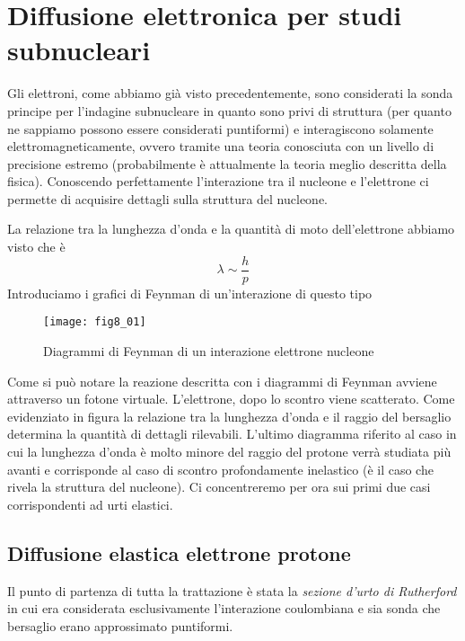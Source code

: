 
\section{Diffusione elettronica per studi subnucleari}
Gli elettroni, come abbiamo già visto precedentemente, sono considerati la sonda principe per l'indagine subnucleare in quanto sono privi di struttura (per quanto ne sappiamo possono essere considerati puntiformi) e interagiscono solamente elettromagneticamente, ovvero tramite una teoria conosciuta con un livello di precisione estremo (probabilmente è attualmente la teoria meglio descritta della fisica).
Conoscendo perfettamente l'interazione tra il nucleone e l'elettrone ci permette di acquisire dettagli sulla struttura del nucleone.

La relazione tra la lunghezza d'onda e la quantità di moto dell'elettrone abbiamo visto che è
\begin{equation}
\lambda\sim \frac{h}{p}
\end{equation}
Introduciamo i grafici di Feynman di un'interazione di questo tipo
\begin{figure}[h]
\centering
\texttt{[image: fig8\_01]}
\caption{Diagrammi di Feynman di un interazione elettrone nucleone}
\end{figure}

Come si può notare la reazione descritta con i diagrammi di Feynman avviene attraverso un fotone virtuale. 
L'elettrone, dopo lo scontro viene scatterato.
Come evidenziato in figura la relazione tra la lunghezza d'onda e il raggio del bersaglio determina la quantità di dettagli rilevabili.
L'ultimo diagramma riferito al caso in cui la lunghezza d'onda è molto minore del raggio del protone verrà studiata più avanti e corrisponde al caso di scontro profondamente inelastico (è il caso che rivela la struttura del nucleone). 
Ci concentreremo per ora sui primi due casi corrispondenti ad urti elastici.

\subsection{Diffusione elastica elettrone protone}
Il punto di partenza di tutta la trattazione è stata la \emph{sezione d'urto di Rutherford} in cui era considerata esclusivamente l'interazione coulombiana e sia  sonda che bersaglio erano approssimato puntiformi.

